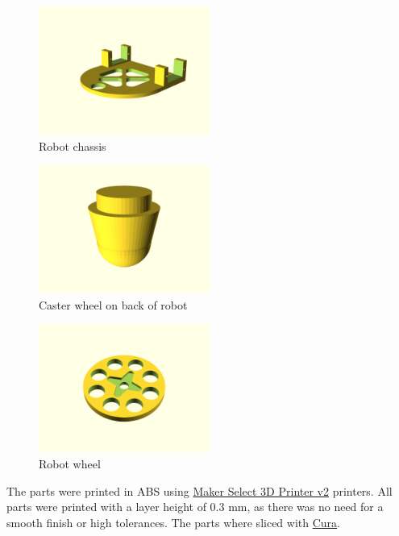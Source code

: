 \documentclass[]{article}
\begin{document}
\begin{figure}
\centering
\includegraphics[width=0.5\textwidth,height=\textheight]{frame.png}
\caption{Robot chassis}
\end{figure}

\begin{figure}
\centering
\includegraphics[width=0.5\textwidth,height=\textheight]{drag.png}
\caption{Caster wheel on back of robot}
\end{figure}

\begin{figure}
\centering
\includegraphics[width=0.5\textwidth,height=\textheight]{wheel.png}
\caption{Robot wheel}
\end{figure}

The parts were printed in ABS using
\href{https://www.monoprice.com/product?c_id=107\&cp_id=10724\&cs_id=1072403\&p_id=13860\&seq=1\&format=2}{Maker
Select 3D Printer v2} printers. All parts were printed with a layer
height of 0.3 mm, as there was no need for a smooth finish or high
tolerances. The parts where sliced with
\href{https://ultimaker.com/en/products/ultimaker-cura-software}{Cura}.
\end{document}
